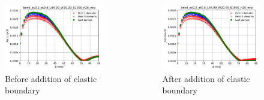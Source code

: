 \begin{frame}
\begin{columns}
\begin{column}{0.45\columnwidth}
\begin{figure}[tbp]
\centering
\includegraphics[width=\columnwidth]{negative_J}
\caption{Before addition of elastic boundary}
\end{figure}
\end{column}
\begin{column}{0.45\columnwidth}
\begin{figure}
\centering
\includegraphics[width=\columnwidth]{negative_J_corrected}
\caption{After addition of elastic boundary}
\end{figure}
\end{column}
\end{columns}
\note{
\vfill
}
\end{frame}

